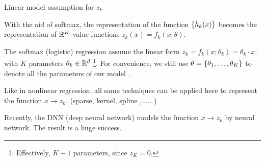 \documentclass[english,handout]{beamer}
\begin{document}
\frame
{
{Linear model assumption  for $z_k$ }
\biz
\item 
With the aid of softmax, the representation 
of the function $\left\{h_k(x)\right\}$ becomes the representation of 
${\mathbb{R}}^K$-value functions ${z_k(x)}=f_k(x;\theta)$.

\item 
The softmax (logistic) regression assume the linear form 
$
z_k = f_k(x;\theta_k)=\theta_k \cdot x,
$
with $K$ parameters $\theta_k\in {\mathbb{R}}^d$
\footnote{
Effectively, $K-1$ parameters,  since $z_K=0$.}.
For convenience, we still
 use ${  \theta}=\left\{\theta_1,\ldots, \theta_K\right\}$ to denote all the parameters of our model .
\item Like in nonlinear regression,
all same techniques can be applied
here to represent the function $x\to z_k$. 
(sparse, kernel, spline ,..... )
 \item
Recently, the DNN (deep neural network)
models the function $x\to z_k$ by neural network.
The result is a huge success.



 \eiz
 
 }
 
\end{document}
